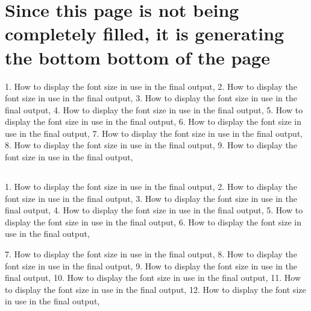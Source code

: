 


%
%


\chapter[Page not filled]{Since this page is not being completely filled, it is generating the bottom bottom of the page}



\showfont

1. How to display the font size in use in the final output,
2. How to display the font size in use in the final output,
3. How to display the font size in use in the final output,
4. How to display the font size in use in the final output,
5. How to display the font size in use in the final output,
6. How to display the font size in use in the final output,
7. How to display the font size in use in the final output,
8. How to display the font size in use in the final output,
9. How to display the font size in use in the final output,


%
\newpage



\section[Some encoding tests]{\showfont}

1. How to display the font size in use in the final output,
2. How to display the font size in use in the final output,
3. How to display the font size in use in the final output,
4. How to display the font size in use in the final output,
5. How to display the font size in use in the final output,
6. How to display the font size in use in the final output,

7. How to display the font size in use in the final output,
8. How to display the font size in use in the final output,
9. How to display the font size in use in the final output,
10. How to display the font size in use in the final output,
11. How to display the font size in use in the final output,
12. How to display the font size in use in the final output,


